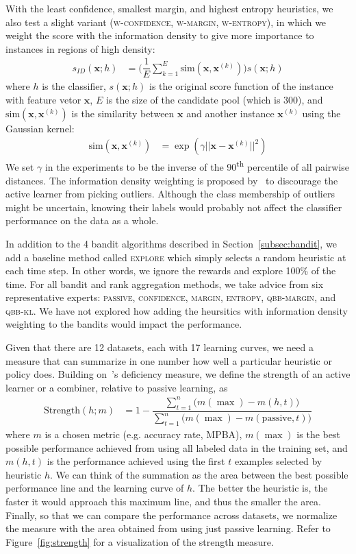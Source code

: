 \documentclass[fleqn,10pt,lineno]{wlpeerj} %
\newcommand{\passive}{\text{passive}}
\begin{document}
With the least confidence, smallest margin, and highest entropy
heuristics, we also test a slight variant (\textsc{w-confidence},
\textsc{w-margin}, \textsc{w-entropy}), in which we weight the score with the
information density to give more importance to instances in regions of high
density:
\begin{align}
	s_{ID}(\bm{x}; h) &=
		\bigg(\dfrac{1}{E} \sum_{k = 1}^E
		\text{sim}(\bm{x}, \bm{x}^{(k)})\bigg) s(\bm{x}; h)
\end{align}
where $h$ is the classifier, $s(\bm{x}; h)$ is the original score function of
the instance with feature vetor $\bm{x}$, $E$ is the size of the candidate pool
(which is 300), and $\text{sim}(\bm{x}, \bm{x}^{(k)})$ is the similarity
between $\bm{x}$ and another instance $\bm{x}^{(k)}$ using the Gaussian kernel:
\begin{align}
	\text{sim}(\bm{x}, \bm{x}^{(k)})
		&= \exp(\gamma ||\bm{x} - \bm{x}^{(k)}||^2)
\end{align}
We set $\gamma$ in the experiments to be the inverse of the
90\textsuperscript{th} percentile of all pairwise distances. The information
density weighting is proposed by~\cite{settles08} to discourage the active
learner from picking outliers. Although the class membership of outliers might
be uncertain, knowing their labels would probably not affect the classifier
performance on the data as a whole.

In addition to the 4 bandit algorithms described in
Section~\ref{subsec:bandit}, we add a baseline method called \textsc{explore}
which simply selects a random heuristic at each time step. In other words, we
ignore the rewards and explore 100\% of the time. For all bandit and rank
aggregation methods, we take advice from six representative experts:
\textsc{passive}, \textsc{confidence}, \textsc{margin}, \textsc{entropy},
\textsc{qbb-margin}, and \textsc{qbb-kl}. We have not explored how adding the
heursitics with information density weighting to the bandits would impact
the performance.

Given that there are 12 datasets, each with 17 learning curves, we
need a measure that can summarize in one number how well a particular heuristic
or policy does. Building on~\cite{baram04}'s deficiency measure, we define the
strength of an active learner or a combiner, relative to passive learning, as
\begin{align}
    \text{Strength}(h; m) &=
    	1 - \dfrac{\sum_{t=1}^{n}\big(m(\max) - m(h, t)\big)}
    	{\sum_{t=1}^{n}\big(m(\max) - m(\passive, t)\big)}
\end{align}
where $m$ is a chosen metric (e.g. accuracy rate, MPBA), $m(\max)$ is the best
possible performance achieved from using all labeled data in the training set,
and $m(h, t)$ is the performance achieved using the first $t$ examples selected
by heuristic $h$. We can think of the summation as the area between the best
possible performance line and the learning curve of $h$. The better the
heuristic is, the faster it would approach this maximum line, and thus the
smaller the area. Finally, so that we can compare the performance across
datasets, we normalize the measure with the area obtained from using just
passive learning. Refer to Figure~\ref{fig:strength} for a visualization of the
strength measure.
\end{document}
